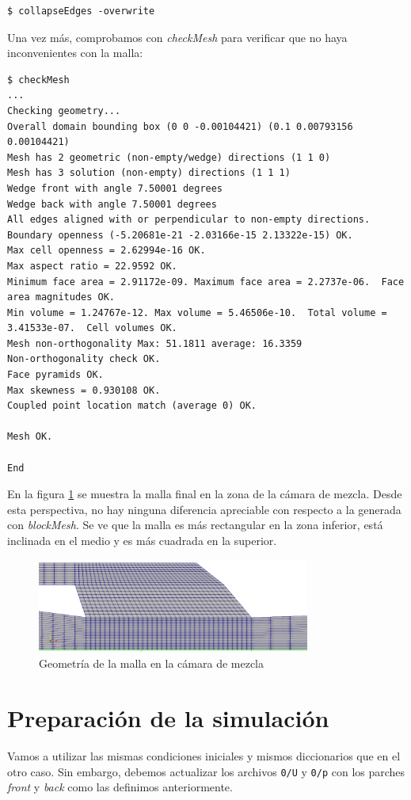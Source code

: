 \documentclass{article}
\begin{document}
\begin{lstlisting}
$ collapseEdges -overwrite
\end{lstlisting}

Una vez más, comprobamos con \textit{checkMesh} para verificar que no haya inconvenientes con la malla:

\begin{lstlisting}
$ checkMesh
...
Checking geometry...
Overall domain bounding box (0 0 -0.00104421) (0.1 0.00793156 0.00104421)
Mesh has 2 geometric (non-empty/wedge) directions (1 1 0)
Mesh has 3 solution (non-empty) directions (1 1 1)
Wedge front with angle 7.50001 degrees
Wedge back with angle 7.50001 degrees
All edges aligned with or perpendicular to non-empty directions.
Boundary openness (-5.20681e-21 -2.03166e-15 2.13322e-15) OK.
Max cell openness = 2.62994e-16 OK.
Max aspect ratio = 22.9592 OK.
Minimum face area = 2.91172e-09. Maximum face area = 2.2737e-06.  Face area magnitudes OK.
Min volume = 1.24767e-12. Max volume = 5.46506e-10.  Total volume = 3.41533e-07.  Cell volumes OK.
Mesh non-orthogonality Max: 51.1811 average: 16.3359
Non-orthogonality check OK.
Face pyramids OK.
Max skewness = 0.930108 OK.
Coupled point location match (average 0) OK.

Mesh OK.

End
\end{lstlisting}

En la figura \ref{fig:malla_camara}  se muestra la malla final en la zona de la cámara de mezcla. Desde esta perspectiva, no hay ninguna diferencia apreciable con respecto a la generada con \textit{blockMesh}. Se ve que la malla es más rectangular en la zona inferior, está inclinada en el medio y es más cuadrada en la superior. 

\begin{figure}[h!]
	\centering
	\includegraphics[width=0.8\textwidth]{Figuras/02_mesh_camara.png}
	\caption{Geometría de la malla en la cámara de mezcla}
	\label{fig:malla_camara}
\end{figure}


\section{Preparación de la simulación}
Vamos a utilizar las mismas condiciones iniciales y mismos diccionarios que en el otro caso. Sin embargo, debemos actualizar los archivos \texttt{0/U} y \texttt{0/p} con los parches \textit{front} y \textit{back} como las definimos anteriormente.
\end{document}
